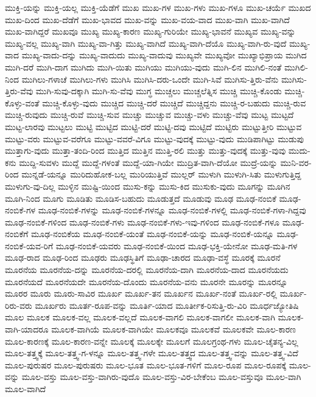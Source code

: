 {ಮುಕ್ತಿ-ಯನ್ನು
ಮುಕ್ತಿ-ಯಲ್ಲ
ಮುಕ್ತಿ-ಯೆಡೆಗೆ
ಮುಖ
ಮುಖ-ಗಳ
ಮುಖ-ಗಳು
ಮುಖ-ಗಳೂ
ಮುಖ-ಚರ್ಯೆ
ಮುಖದ
ಮುಖ-ದಿಂದ
ಮುಖ-ದೆಡೆಗೆ
ಮುಖ-ಭಾವದ
ಮುಖ-ವನ್ನು
ಮುಖ-ವಯ-ವಾದ
ಮುಖ-ವಾಗಿ
ಮುಖ-ವಾಗಿದೆ
ಮುಖ-ವಾಗಿದ್ದರೆ
ಮುಖವೂ
ಮುಖ್ಯ
ಮುಖ್ಯ-ಕಾರಣ
ಮುಖ್ಯ-ಗುರಿಯೇ
ಮುಖ್ಯ-ಭಾವನೆ
ಮುಖ್ಯವ
ಮುಖ್ಯ-ವನ್ನು
ಮುಖ್ಯ-ವಲ್ಲ
ಮುಖ್ಯ-ವಾಗಿ
ಮುಖ್ಯ-ವಾ-ಗಿತ್ತು
ಮುಖ್ಯ-ವಾಗಿದೆ
ಮುಖ್ಯ-ವಾಗಿ-ದೆಯೊ
ಮುಖ್ಯ-ವಾಗಿ-ರು-ವುದೆ
ಮುಖ್ಯ-ವಾದ
ಮುಖ್ಯ-ವಾದು-ದನ್ನು
ಮುಖ್ಯ-ವಾದುದು
ಮುಖ್ಯ-ವಾದುವು
ಮುಖ್ಯವೇ
ಮುಖ್ಯವೋ
ಮುಖ್ಯಾಭಿಪ್ರಾಯ
ಮುಗಿದ
ಮುಗಿ-ದರೆ
ಮುಗಿ-ದಾಗ
ಮುಗಿದು
ಮುಗಿ-ಯಿತು
ಮುಗಿಯು
ಮುಗಿಯು-ವುದು
ಮುಗಿ-ಲಿನ
ಮುಗಿಲಿ-ನಂತೆ
ಮುಗಿಲಿ-ನಿಂದ
ಮುಗಿಲು-ಗಳಾಚೆ
ಮುಗಿಲು-ಗಳು
ಮುಗಿಸಿ
ಮುಗಿಸಿ-ದರು-ಒಂದೇ
ಮುಗಿ-ಸಿವೆ
ಮುಗಿಸು-ತ್ತಿರು-ವೆನು
ಮುಗಿಸು-ತ್ತಿರು-ವೆವು
ಮುಗಿ-ಸುವು-ದಕ್ಕಾಗಿ
ಮುಗಿ-ಸು-ವೆವು
ಮುಗ್ಧ
ಮುಚ್ಚಲು
ಮುಚ್ಚಲೆತ್ನಿಸ
ಮುಚ್ಚಿ
ಮುಚ್ಚಿ-ಕೊಂಡು
ಮುಚ್ಚಿ-ಕೊಳ್ಳು-ವಂತೆ
ಮುಚ್ಚಿ-ಕೊಳ್ಳು-ವುದು
ಮುಚ್ಚಿದ
ಮುಚ್ಚಿ-ದರೆ
ಮುಚ್ಚಿದೆ
ಮುಚ್ಚಿದ್ದನು
ಮುಚ್ಚಿ-ರ-ಬಹುದು
ಮುಚ್ಚಿ-ರುವ
ಮುಚ್ಚಿ-ರುವುದು
ಮುಚ್ಚಿ-ರುವೆ
ಮುಚ್ಚಿ-ಸುವ
ಮುಚ್ಚು
ಮುಚ್ಚುವ
ಮುಚ್ಚು-ವಳು
ಮುಚ್ಚು-ವೆವು
ಮುಟ್ಟ
ಮುಟ್ಟದೆ
ಮುಟ್ಟ-ಲಾರವು
ಮುಟ್ಟಲು
ಮುಟ್ಟಿ
ಮುಟ್ಟಿದ
ಮುಟ್ಟಿ-ದರೆ
ಮುಟ್ಟಿ-ದವು
ಮುಟ್ಟಿದೆ
ಮುಟ್ಟಿರು
ಮುಟ್ಟುತ್ತೀರಿ
ಮುಟ್ಟುವ
ಮುಟ್ಟು-ವರು
ಮುಟ್ಟುವ-ವರೆಗೂ
ಮುಟ್ಟು-ವವರೆ-ವಿಗೂ
ಮುಟ್ಟು-ವುದಕ್ಕೆ
ಮುಟ್ಟು-ವುದು
ಮುಡಿಪಾಗಿಟ್ಟು
ಮುಡುಪು
ಮುತ್ತಾಗು-ವುದು
ಮುತ್ತಾ-ತಂದಿ-ರಿಂದ
ಮುತ್ತಿದ
ಮುತ್ತಿನ
ಮುತ್ತಿ-ರಲಿ
ಮುತ್ತು
ಮುತ್ತು-ವುದಕ್ಕೆ
ಮುತ್ತು-ವುವು
ಮುದು-ಕನು
ಮುದ್ದಿ-ಸುವಳು
ಮುದ್ದೆ
ಮುದ್ದೆ-ಗಳಂತೆ
ಮುದ್ದೆ-ಯಾ-ಗಿಯೇ
ಮುದ್ರಿತ-ವಾಗಿ-ದೆಯೋ
ಮುದ್ರೆ-ಯನ್ನು
ಮುನಿ-ವರ-ರಿಂದ
ಮುನ್ನಡೆ-ಯನ್ನೂ
ಮುರಿದುಹೋಕ-ಬಲ್ಲ
ಮುರಿಯುತ್ತಿವೆ
ಮುಲ್ಲರ್
ಮುಳುಗಿ
ಮುಳುಗಿ-ಸಿತು
ಮುಳುಗುತ್ತಿದ್ದ
ಮುಳುಗು-ವು-ದಿಲ್ಲ
ಮುಳ್ಳಿನ
ಮುಷ್ಟಿ-ಯಿಂದ
ಮುಸು-ಕನ್ನು
ಮುಸು-ಕಿದ
ಮುಸುಕು-ವುದು
ಮೂಗನ್ನು
ಮೂಗಿನ
ಮೂಗಿ-ನಿಂದ
ಮೂಗು
ಮೂಡಿತು
ಮೂಡಿಸ-ಬಹುದು
ಮೂಡುತ್ತದೆ
ಮೂಡುವು
ಮೂಢ
ಮೂಢ-ನಂಬಿಕೆ
ಮೂಢ-ನಂಬಿಕೆ-ಗಳ
ಮೂಢ-ನಂಬಿಕೆ-ಗಳನ್ನು
ಮೂಢ-ನಂಬಿಕೆ-ಗಳನ್ನೂ
ಮೂಢ-ನಂಬಿಕೆ-ಗಳಲ್ಲಿ
ಮೂಢ-ನಂಬಿಕೆ-ಗಳಾ-ಗಿದ್ದವು
ಮೂಢ-ನಂಬಿಕೆ-ಗಳಿಂದ
ಮೂಢ-ನಂಬಿಕೆ-ಗಳು
ಮೂಢ-ನಂಬಿಕೆ-ಗಳು-ಇವು-ಗಳಿಂದ
ಮೂಢ-ನಂಬಿಕೆ-ಗಳೂ
ಮೂಢ-ನಂಬಿಕೆಗೆ
ಮೂಢ-ನಂಬಿಕೆಯ
ಮೂಢ-ನಂಬಿಕೆ-ಯಂತೆ
ಮೂಢ-ನಂಬಿಕೆ-ಯನ್ನು
ಮೂಢ-ನಂಬಿಕೆ-ಯನ್ನೂ
ಮೂಢ-ನಂಬಿಕೆ-ಯವ-ರಿಗೆ
ಮೂಢ-ನಂಬಿಕೆ-ಯವರು
ಮೂಢ-ನಂಬಿಕೆ-ಯಿಂದ
ಮೂಢ-ಭಕ್ತಿ-ಯೇನೋ
ಮೂಢ-ಮತಿ-ಗಳ
ಮೂಢ-ರಾದ
ಮೂಢ-ರಿಂದ
ಮೂಢರು
ಮೂಢಸ್ಥಿತಿಗೆ
ಮೂಢಾ-ಚಾರದ
ಮೂಢಾ-ವಸ್ಥೆ
ಮೂರಕ್ಕೆ
ಮೂರನೆ
ಮೂರನೆಯ
ಮೂರನೆಯ-ದನ್ನು
ಮೂರನೆಯ-ದರಲ್ಲಿ
ಮೂರನೆಯ-ದಾಗಿ
ಮೂರನೆಯ-ದಾದ
ಮೂರನೆಯದು
ಮೂರನೆಯದೆ
ಮೂರನೆಯದೇ
ಮೂರನೆಯ-ದೊಂದು
ಮೂರನೆಯ-ವನು
ಮೂರನೇ
ಮೂರನ್ನು
ಮೂರನ್ನೂ
ಮೂರರ
ಮೂರು
ಮೂರು-ಸಾವಿರ
ಮೂರ್ಖ
ಮೂರ್ಖ-ತನ
ಮೂರ್ಖನ
ಮೂರ್ಖ-ನಂತೆ
ಮೂರ್ಖ-ರಲ್ಲಿ
ಮೂರ್ಖ-ರಿರು-ವರು
ಮೂರ್ಖರು
ಮೂರ್ತ-ರೂಪ-ವನ್ನು
ಮೂರ್ತಿ-ಯಾದ
ಮೂರ್ತೀಕ-ರಿಸುತ್ತಿ-ರು-ವಿರಿ
ಮೂರ್ಧಜ್ಯೋತಿಷಿ
ಮೂಲ
ಮೂಲಕ
ಮೂಲಕ-ವಲ್ಲ
ಮೂಲಕ-ವಲ್ಲದೆ
ಮೂಲಕ-ವಾಗಲಿ
ಮೂಲಕ-ವಾಗಲೀ
ಮೂಲಕ-ವಾಗಿ
ಮೂಲಕ-ವಾಗಿ-ಯಾದರೂ
ಮೂಲಕ-ವಾಗಿಯೆ
ಮೂಲಕ-ವಾಗಿಯೇ
ಮೂಲಕವೂ
ಮೂಲಕವೆ
ಮೂಲಕವೇ
ಮೂಲ-ಕಾರಣ
ಮೂಲ-ಕಾರಣಕ್ಕೆ
ಮೂಲ-ಕಾರಣ-ವನ್ನೇ
ಮೂಲಕ್ಕೆ
ಮೂಲಕ್ಕೇ
ಮೂಲಗೆ
ಮೂಲಗ್ರಂಥ-ಗಳು
ಮೂಲ-ಚೈತನ್ಯ-ವಿಲ್ಲ
ಮೂಲ-ತತ್ತ್ವಕ್ಕೆ
ಮೂಲ-ತತ್ತ್ವ-ಗ-ಳನ್ನೂ
ಮೂಲ-ತತ್ತ್ವ-ಗಳೇ
ಮೂಲ-ತತ್ತ್ವದ
ಮೂಲ-ತತ್ತ್ವ-ವನ್ನು
ಮೂಲ-ತತ್ತ್ವ-ವಿದೆ
ಮೂಲ-ಪುರುಷರ
ಮೂಲ-ಪುರುಷರು
ಮೂಲ-ಭೂತ
ಮೂಲ-ಭೂತ-ಗಳಿಗೆ
ಮೂಲ-ರೂಪ
ಮೂಲ-ರೂಪಕ್ಕೆ
ಮೂಲ-ವನ್ನು
ಮೂಲ-ವಸ್ತು
ಮೂಲ-ವಸ್ತು-ವಾಗಿರು-ವುದೊ
ಮೂಲ-ವಸ್ತು-ವಿರ-ಬೇಕೆಂಬ
ಮೂಲ-ವಸ್ತುವೂ
ಮೂಲ-ವಾಗಿ
ಮೂಲ-ವಾಗಿದೆ
}
